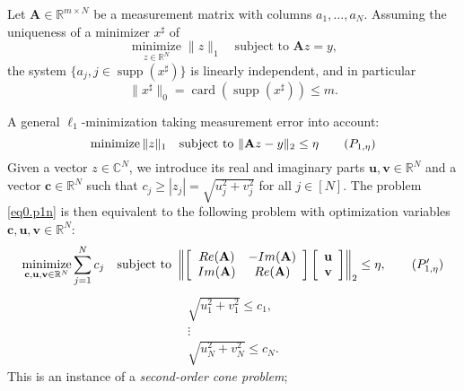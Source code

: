 \begin{theorem}
    \label{th0.3.1}
    Let $\mathbf{A} \in \mathbb{R}^{m \times N}$ be a measurement matrix with columns $a_1, \dots, a_N$. Assuming the uniqueness of a minimizer $x^{\sharp}$ of 
    \[
        \mathop{\mathrm{minimize}}\limits_{z \in \mathbb{R}^N} \|z\|_1 \quad \text{subject to } \mathbf{A}z = y,
    \]
    the system $\{a_j, j\in \mathop{\mathrm{supp}}(x^{\sharp})\}$ is linearly independent, and in particular 
    \[
        \|x^{\sharp}\|_0 = \mathop{\mathrm{card}}(\mathop{\mathrm{supp}}(x^{\sharp})) \leq m.
    \]
\end{theorem}

A general $\ell_1$-minimization taking measurement error into account:
\begin{equation}
    \mathop{\mathrm{minimize}}\|z\|_1 \quad \text{subject to } \|\mathbf{A}z-y\|_2 \leq \eta \tag{$P_{1,\eta}$}
    \label{eq0.p1n}
\end{equation}
Given a vector $z \in \mathbb{C}^N$, we introduce its real and imaginary parts $\mathbf{u,v} \in \mathbb{R}^N$ and a vector $\mathbf{c} \in \mathbb{R}^N$ such that $c_j \geq \left|z_j\right| = \sqrt{u_j^2 + v_j^2}$ for all $j \in [N]$. The problem \cref{eq0.p1n} is then equivalent to the following problem with optimization variables $\mathbf{c,u,v} \in \mathbb{R}^N$:
\begin{equation}
    \mathop{\mathrm{minimize}}\limits_{\mathbf{c,u,v} \in \mathbb{R}^N} \sum\limits_{j=1}^N c_j \quad \text{subject to } \left\|\left[ 
        \begin{array}{cc}
            Re(\mathbf{A}) & -Im(\mathbf{A}) \\
            Im(\mathbf{A}) & Re(\mathbf{A})
        \end{array}
        \right]
        \left[ 
         \begin{array}{c}
            \mathbf{u}\\
            \mathbf{v}
        \end{array}
    \right]\right\|_2 \leq \eta, \tag{$P_{1,\eta}'$}
    \label{eq0.p1n'}
\end{equation}
\[
    \begin{array}{c}
        \sqrt{u_1^2 + v_1^2} \leq c_1, \\
        \vdots \\
        \sqrt{u_N^2 + v_N^2} \leq c_N.
    \end{array}
\]
This is an instance of a \emph{\textcolor[rgb]{1,0,0}{second-order cone problem}};

